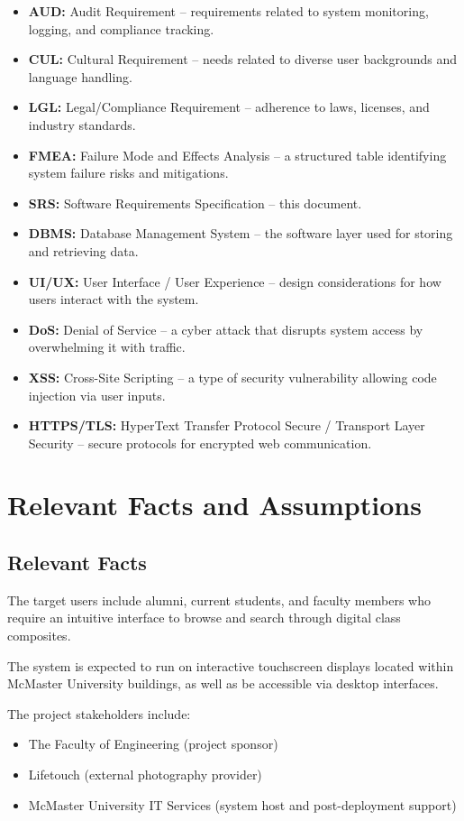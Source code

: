 \documentclass[12pt]{article}
\begin{document}
\begin{itemize}
  \item \textbf{AUD:} Audit Requirement – requirements related to system monitoring, logging, and compliance tracking.
  \item \textbf{CUL:} Cultural Requirement – needs related to diverse user backgrounds and language handling.
  \item \textbf{LGL:} Legal/Compliance Requirement – adherence to laws, licenses, and industry standards.
  \item \textbf{FMEA:} Failure Mode and Effects Analysis – a structured table identifying system failure risks and mitigations.
  \item \textbf{SRS:} Software Requirements Specification – this document.
  \item \textbf{DBMS:} Database Management System – the software layer used for storing and retrieving data.
  \item \textbf{UI/UX:} User Interface / User Experience – design considerations for how users interact with the system.
  \item \textbf{DoS:} Denial of Service – a cyber attack that disrupts system access by overwhelming it with traffic.
  \item \textbf{XSS:} Cross-Site Scripting – a type of security vulnerability allowing code injection via user inputs.
  \item \textbf{HTTPS/TLS:} HyperText Transfer Protocol Secure / Transport Layer Security – secure protocols for encrypted web communication.
\end{itemize}

\section{Relevant Facts and Assumptions}

\subsection{Relevant Facts}

The target users include alumni, current students, and faculty members who require an intuitive interface to browse and search through digital class composites.

The system is expected to run on interactive touchscreen displays located within McMaster University buildings, as well as be accessible via desktop interfaces.

The project stakeholders include:
\begin{itemize}
  \item The Faculty of Engineering (project sponsor)
  \item Lifetouch (external photography provider)
  \item McMaster University IT Services (system host and post-deployment support)
\end{itemize}
\end{document}
